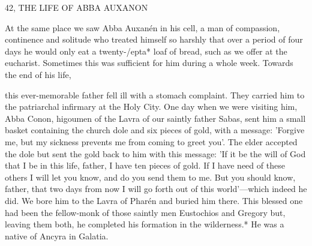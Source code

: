 42, THE LIFE OF ABBA AUXANON

At the same place we saw Abba Auxanén in his cell, a man of
compassion, continence and solitude who treated himself so harshly
that over a period of four days he would only eat a twenty-/epta*
loaf of bread, such as we offer at the eucharist.
Sometimes this was
sufficient for him during a whole week.
Towards the end of his life,

this ever-memorable father fell ill with a stomach complaint.
They
carried him to the patriarchal infirmary at the Holy City.
One day
when we were visiting him, Abba Conon, higoumen of the Lavra of
our saintly father Sabas, sent him a small basket containing the
church dole and six pieces of gold, with a message: 'Forgive me, but
my sickness prevents me from coming to greet you'.
The elder
accepted the dole but sent the gold back to him with this message:
'If it be the will of God that I be in this life, father, I have ten
pieces of gold.
If I have need of these others I will let you know,
and do you send them to me.
But you should know, father, that
two days from now I will go forth out of this world'—which indeed
he did.
We bore him to the Lavra of Pharén and buried him there.
This blessed one had been the fellow-monk of those saintly men
Eustochios and Gregory but, leaving them both, he completed his
formation in the wilderness.* He was a native of Ancyra in Galatia.

